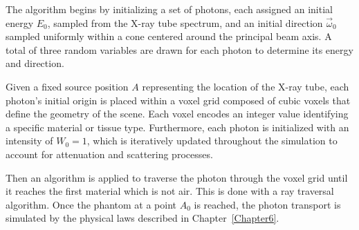 The algorithm begins by initializing a set of photons, each assigned an initial
energy $E_0$, sampled from the X-ray tube spectrum, and an initial direction
$\vec{\omega}_0$ sampled uniformly within a cone centered around the principal
beam axis. A total of three random variables are drawn for each photon to
determine its energy and direction.

Given a fixed source position $A$ representing the location of the X-ray tube,
each photon's initial origin is placed within a voxel grid composed of cubic
voxels that define the geometry of the scene. Each voxel encodes an integer
value identifying a specific material or tissue type. Furthermore, each photon
is initialized with an intensity of $W_0=1$, which is iteratively updated
throughout the simulation to account for attenuation and scattering processes.

\begin{figure}[H]
    \centering
\end{figure}

Then an algorithm is applied to traverse the photon through the voxel grid until
it reaches the first material which is not air. This is done with a ray
traversal algorithm. Once the phantom at a point $A_0$ is reached, the photon
transport is simulated by the physical laws described in Chapter~\ref{Chapter6}.

